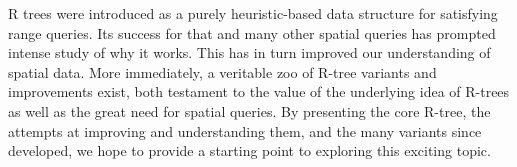 R trees were introduced as a purely heuristic-based data structure for satisfying range queries.
Its success for that and many other spatial queries has prompted intense study of why it works.
This has in turn improved our understanding of spatial data.
More immediately, a veritable zoo of R-tree variants and improvements exist, both testament to the value of the underlying idea of R-trees as well as the great need for spatial queries.
By presenting the core R-tree, the attempts at improving and understanding them, and the many variants since developed, we hope to provide a starting point to exploring this exciting topic.


